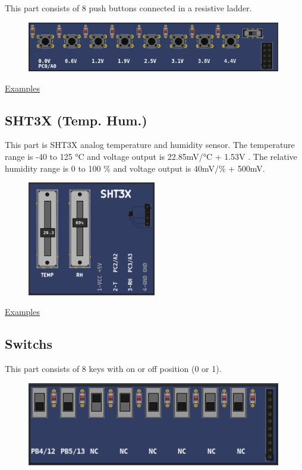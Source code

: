 This part consists of 8 push buttons connected in a resistive ladder.

\begin{figure}[H]
\center
\includegraphics[width=0.99\textwidth]{img/part_push_a.png} 
\end{figure}

\href{https://lcgamboa.github.io/picsimlab_examples/examples/examples_index.html\#Push_buttons\_(Analogic)}{Examples}

\subsection{SHT3X (Temp. Hum.)}

This part is SHT3X analog temperature and humidity sensor. The temperature  range is -40 to 125 °C  and 
voltage output is 22.85mV/°C + 1.53V . The relative humidity range is 0 to 100 \%  and voltage output is 40mV/\% + 500mV.

\begin{figure}[H]
\center
\includegraphics[width=0.5\textwidth]{img/part_sht3x.png} 
\end{figure} 


\href{https://lcgamboa.github.io/picsimlab_examples/examples/examples_index.html\#SHT3X_(Temp._Hum.)}{Examples}



\subsection{Switchs}
This part consists of 8 keys with on or off position (0 or 1).

\begin{figure}[H]
\center
\includegraphics[width=0.99\textwidth]{img/part_switchs.png} 
\end{figure} 

